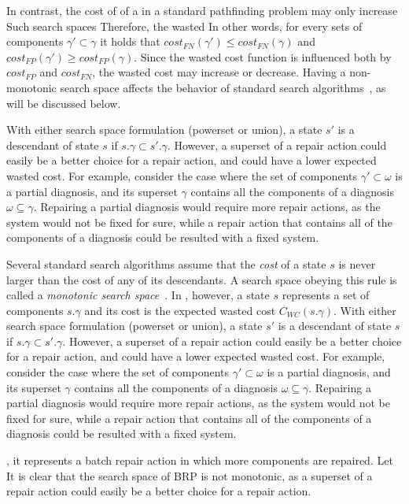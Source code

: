 In contrast, the cost of of a in a standard pathfinding problem may only increase
Such search spaces 
Therefore, the wasted 
In other words, for every sets of components $\gamma' \subset \gamma$
it holds that $cost_{FN}(\gamma')\leq cost_{FN}(\gamma)$ 
and $cost_{FP}(\gamma')\geq cost_{FP}(\gamma)$. Since the wasted cost function is influenced both by $cost_{FP}$ and $cost_{FN}$, the wasted cost may increase or decrease. 
Having a non-monotonic search space affects the behavior of standard search algorithms~\cite{stern2014max}, as will be discussed below. 

With either search space formulation (powerset or union), a state $s'$ is a descendant of state $s$ 
if $s.\gamma\subset s'.\gamma$. However, a superset of a repair action could easily be a better choice for a repair action, and could have a lower expected wasted cost. 
For example, consider the case where the set of components $\gamma' \subset \omega$ is a partial diagnosis, and its superset $\gamma$ contains all the components of a diagnosis $\omega \subseteq \gamma$. Repairing a partial diagnosis would require more repair actions, as the system would not be fixed for sure, while a repair action that contains all of the components of a diagnosis could be resulted with a fixed system.



Several standard search algorithms assume that the \emph{cost} of a state $s$ is 
never larger than the cost of any of its descendants. A search space obeying this rule is called a \emph{monotonic search space}~\cite{stern2014max}. 
In \brpswc{}, however, a state $s$ represents a set of components $s.\gamma$ 
and its cost is the expected wasted cost $C_{WC}(s.\gamma)$. With either search space formulation (powerset or union), a state $s'$ is a descendant of state $s$ 
if $s.\gamma\subset s'.\gamma$. However, a superset of a repair action could easily be a better choice for a repair action, and could have a lower expected wasted cost. 
For example, consider the case where the set of components $\gamma' \subset \omega$ is a partial diagnosis, and its superset $\gamma$ contains all the components of a diagnosis $\omega \subseteq \gamma$. Repairing a partial diagnosis would require more repair actions, as the system would not be fixed for sure, while a repair action that contains all of the components of a diagnosis could be resulted with a fixed system.



, it represents a batch repair action in which more components are repaired. Let 
It is clear that the search space of BRP is not monotonic, as a superset of a repair action could easily be a better choice for a repair action. 



